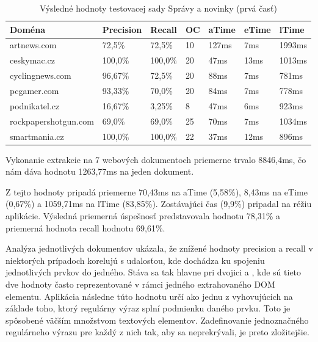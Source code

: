 \begin{table}[hbt]
\caption{Výsledné hodnoty testovacej sady Správy a novinky (prvá časť)}
\centering
\begin{tabular}{|l|l|l|l|l|l|l|}
\hline
\textbf{Doména}          & \textbf{Precision} & \textbf{Recall}  & \textbf{OC}  & \textbf{aTime} & \textbf{eTime} & \textbf{lTime}  \\ \hline
artnews.com             & 72,5\%    & 72,5\%  & 10 & 127ms & 7ms   & 1993ms \\ \hline
ceskymac.cz             & 100,0\%   & 100,0\% & 20 & 47ms  & 13ms  & 1013ms \\ \hline
cyclingnews.com         & 96,67\%   & 72,5\%  & 20 & 88ms  & 7ms   & 781ms  \\ \hline
pcgamer.com             & 93,33\%   & 70,0\%  & 20 & 84ms  & 7ms   & 778ms  \\ \hline
podnikatel.cz           & 16,67\%   & 3,25\%  & 8  & 47ms  & 6ms   & 923ms  \\ \hline
rockpapershotgun.com    & 69,0\%    & 69,0\%  & 25 & 70ms  & 7ms   & 1034ms \\ \hline
smartmania.cz           & 100,0\%   & 100,0\% & 22 & 37ms  & 12ms  & 896ms  \\ \hline
\end{tabular}
\end{table}

Vykonanie extrakcie na 7 webových dokumentoch priemerne trvalo 8846,4ms, čo nám dáva hodnotu 1263,77ms na jeden dokument. 

Z tejto hodnoty pripadá priemerne 70,43ms na aTime (5,58\%), 8,43ms na eTime (0,67\%) a 1059,71ms na lTime (83,85\%). Zostávajúci čas (9,9\%) pripadal na réžiu aplikácie. Výsledná priemerná úspešnosť predstavovala hodnotu 78,31\% a priemerná hodnota recall hodnotu 69,61\%. 

\bigskip

Analýza jednotlivých dokumentov ukázala, že znížené hodnoty precision a recall v niektorých prípadoch korelujú s udalosťou, kde dochádza ku spojeniu jednotlivých prvkov do jedného. Stáva sa tak hlavne pri dvojici  a , kde sú tieto dve hodnoty často reprezentované v rámci jedného extrahovaného DOM elementu. Aplikácia následne túto hodnotu určí ako jednu z vyhovujúcich na základe toho, ktorý regulárny výraz splní podmienku daného prvku. Toto je spôsobené väčším množstvom textových elementov. Zadefinovanie jednoznačného regulárneho výrazu pre každý z nich tak, aby sa neprekrývali, je preto zložitejšie.

